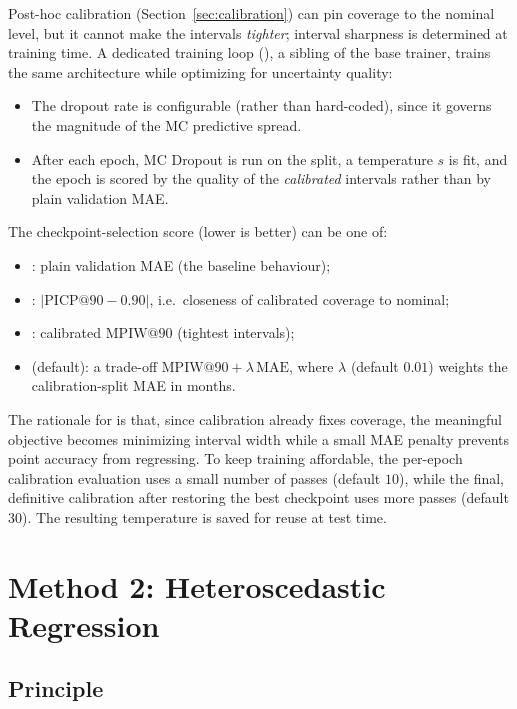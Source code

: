 Post-hoc calibration (Section~\ref{sec:calibration}) can pin coverage to the
nominal level, but it cannot make the intervals \emph{tighter}; interval
sharpness is determined at training time. A dedicated training loop
(), a sibling of the base trainer, trains the same
architecture while optimizing for uncertainty quality:
\begin{itemize}
  \item The dropout rate is configurable (rather than hard-coded), since it
  governs the magnitude of the MC predictive spread.
  \item After each epoch, MC Dropout is run on the  split, a
  temperature $s$ is fit, and the epoch is scored by the quality of the
  \emph{calibrated} intervals rather than by plain validation MAE.
\end{itemize}

The checkpoint-selection score (lower is better) can be one of:
\begin{itemize}
  \item {}: plain validation MAE (the baseline behaviour);
  \item {}: $\lvert \mathrm{PICP}@90 - 0.90 \rvert$, i.e.\ closeness
  of calibrated coverage to nominal;
  \item {}: calibrated $\mathrm{MPIW}@90$ (tightest intervals);
  \item {} (default): a trade-off
  $\mathrm{MPIW}@90 + \lambda\,\mathrm{MAE}$, where $\lambda$ (default $0.01$)
  weights the calibration-split MAE in months.
\end{itemize}
The rationale for  is that, since calibration already fixes
coverage, the meaningful objective becomes minimizing interval width while a
small MAE penalty prevents point accuracy from regressing. To keep training
affordable, the per-epoch calibration evaluation uses a small number of passes
(default $10$), while the final, definitive calibration after restoring the best
checkpoint uses more passes (default $30$). The resulting temperature is saved
for reuse at test time.

\section{Method 2: Heteroscedastic Regression}
\label{sec:hetero}

\subsection{Principle}


